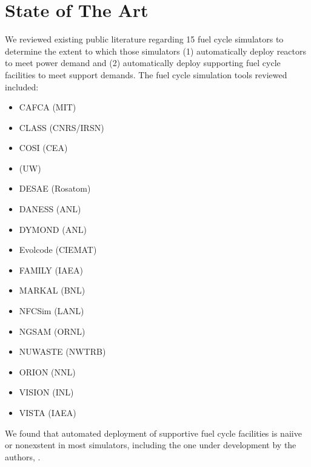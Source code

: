 \section{State of The Art}
We reviewed existing public literature regarding 15 fuel cycle simulators to 
determine the extent to which those simulators (1) automatically deploy reactors to 
meet power demand and (2) automatically deploy supporting fuel cycle facilities 
to meet support demands. The fuel cycle simulation tools reviewed included:
\begin{itemize}
        \item CAFCA (MIT) \cite{guerin_impact_2009} %
        \item CLASS (CNRS/IRSN) \cite{mouginot_class_2012} 
        \item COSI (CEA) \cite{coquelet-pascal_cosi6:_2015,boucher_international_2010}
        \item \Cyclus (UW) \cite{huff_fundamental_2014} %
        \item DESAE (Rosatom) \cite{boucher_international_2010}
        \item DANESS (ANL) \cite{van_den_durpel_daness:_2006} %
        \item DYMOND (ANL) \cite{boucher_international_2010}
        \item Evolcode (CIEMAT) \cite{boucher_international_2010}
        \item FAMILY (IAEA) \cite{boucher_international_2010}
        \item MARKAL (BNL) \cite{feng_standardized_2016}
        \item NFCSim (LANL) \cite{schneider_nfcsim:_2005}
        \item NGSAM (ORNL) \cite{aubin_development_2013}
        \item NUWASTE (NWTRB) \cite{garrick_nuclear_2011}
        \item ORION (NNL) \cite{feng_standardized_2016}
        \item VISION (INL) \cite{feng_standardized_2016,boucher_international_2010}
        \item VISTA (IAEA) \cite{iaea_nuclear_2007}
\end{itemize}

We found that automated deployment of supportive fuel cycle facilities is naiive or 
nonexstent in most simulators, including the one under development by the 
authors, \Cyclus.

